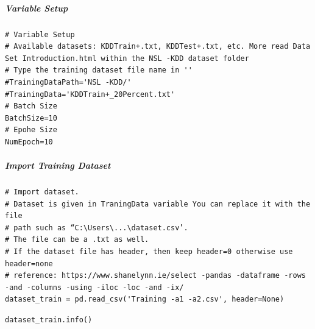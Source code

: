 \subparagraph{Variable Setup}

\begin{verbatim}
# Variable Setup
# Available datasets: KDDTrain+.txt, KDDTest+.txt, etc. More read Data Set Introduction.html within the NSL -KDD dataset folder
# Type the training dataset file name in ''
#TrainingDataPath='NSL -KDD/'
#TrainingData='KDDTrain+_20Percent.txt'
# Batch Size
BatchSize=10
# Epohe Size
NumEpoch=10
\end{verbatim}

\subparagraph{Import Training Dataset}

\begin{verbatim}
# Import dataset.
# Dataset is given in TraningData variable You can replace it with the file 
# path such as “C:\Users\...\dataset.csv’. 
# The file can be a .txt as well. 
# If the dataset file has header, then keep header=0 otherwise use header=none
# reference: https://www.shanelynn.ie/select -pandas -dataframe -rows -and -columns -using -iloc -loc -and -ix/
dataset_train = pd.read_csv('Training -a1 -a2.csv', header=None)
\end{verbatim}

\begin{verbatim}
dataset_train.info()
\end{verbatim}

